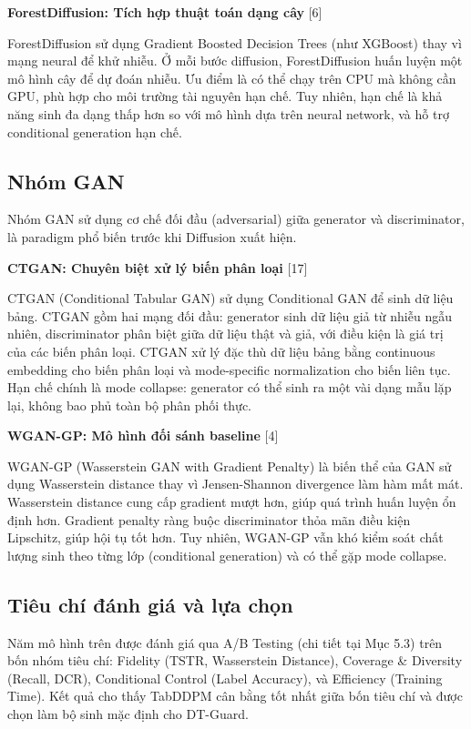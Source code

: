\textbf{ForestDiffusion: Tích hợp thuật toán dạng cây} {[}6{]}

ForestDiffusion sử dụng Gradient Boosted Decision Trees (như XGBoost) thay vì mạng neural để khử nhiễu. Ở mỗi bước diffusion, ForestDiffusion huấn luyện một mô hình cây để dự đoán nhiễu. Ưu điểm là có thể chạy trên CPU mà không cần GPU, phù hợp cho môi trường tài nguyên hạn chế. Tuy nhiên, hạn chế là khả năng sinh đa dạng thấp hơn so với mô hình dựa trên neural network, và hỗ trợ conditional generation hạn chế.

\subsection{Nhóm GAN}
Nhóm GAN sử dụng cơ chế đối đầu (adversarial) giữa generator và discriminator, là paradigm phổ biến trước khi Diffusion xuất hiện.

\textbf{CTGAN: Chuyên biệt xử lý biến phân loại} {[}17{]}

CTGAN (Conditional Tabular GAN) sử dụng Conditional GAN để sinh dữ liệu bảng. CTGAN gồm hai mạng đối đầu: generator sinh dữ liệu giả từ nhiễu ngẫu nhiên, discriminator phân biệt giữa dữ liệu thật và giả, với điều kiện là giá trị của các biến phân loại. CTGAN xử lý đặc thù dữ liệu bảng bằng continuous embedding cho biến phân loại và mode-specific normalization cho biến liên tục. Hạn chế chính là mode collapse: generator có thể sinh ra một vài dạng mẫu lặp lại, không bao phủ toàn bộ phân phối thực.

\textbf{WGAN-GP: Mô hình đối sánh baseline} {[}4{]}

WGAN-GP (Wasserstein GAN with Gradient Penalty) là biến thể của GAN sử dụng Wasserstein distance thay vì Jensen-Shannon divergence làm hàm mất mát. Wasserstein distance cung cấp gradient mượt hơn, giúp quá trình huấn luyện ổn định hơn. Gradient penalty ràng buộc discriminator thỏa mãn điều kiện Lipschitz, giúp hội tụ tốt hơn. Tuy nhiên, WGAN-GP vẫn khó kiểm soát chất lượng sinh theo từng lớp (conditional generation) và có thể gặp mode collapse.

\subsection{Tiêu chí đánh giá và lựa chọn}
Năm mô hình trên được đánh giá qua A/B Testing (chi tiết tại Mục 5.3) trên bốn nhóm tiêu chí: Fidelity (TSTR, Wasserstein Distance), Coverage \& Diversity (Recall, DCR), Conditional Control (Label Accuracy), và Efficiency (Training Time). Kết quả cho thấy TabDDPM cân bằng tốt nhất giữa bốn tiêu chí và được chọn làm bộ sinh mặc định cho DT-Guard.


